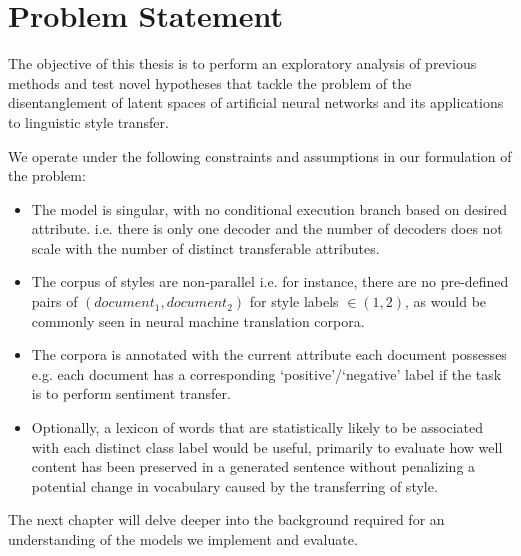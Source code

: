 \section{Problem Statement}

The objective of this thesis is to perform an exploratory analysis of previous methods and test novel hypotheses that tackle the problem of the disentanglement of latent spaces of artificial neural networks and its applications to linguistic style transfer.

We operate under the following constraints and assumptions in our formulation of the problem:

\begin{itemize}
	\item The model is singular, with no conditional execution branch based on desired attribute. i.e. there is only one decoder and the number of decoders does not scale with the number of distinct transferable attributes.
	\item The corpus of styles are non-parallel i.e. for instance, there are no pre-defined pairs of $(document_1, document_2)$ for style labels $\in (1, 2)$, as would be commonly seen in neural machine translation corpora.
	\item The corpora is annotated with the current attribute each document possesses e.g. each document has a corresponding `positive'/`negative' label if the task is to perform sentiment transfer.
	\item Optionally, a lexicon of words that are statistically likely to be associated with each distinct class label would be useful, primarily to evaluate how well content has been preserved in a generated sentence without penalizing a potential change in vocabulary caused by the transferring of style.
\end{itemize}

The next chapter will delve deeper into the background required for an understanding of the models we implement and evaluate.

